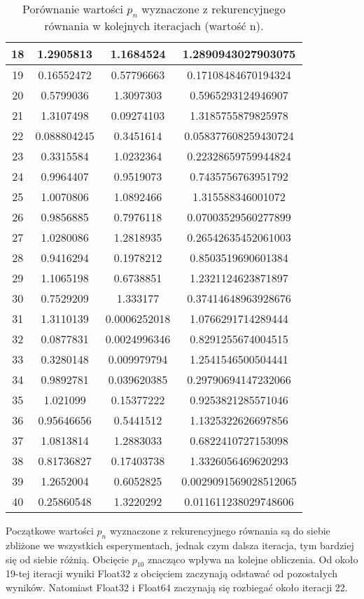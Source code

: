 \documentclass{article}
\begin{document}
\begin{table}[H]
\begin{tabular}{|c|c|c|c|}
18 & 1.2905813 & 1.1684524 & 1.2890943027903075\\ \hline
19 & 0.16552472 & 0.57796663 & 0.17108484670194324\\ \hline
20 & 0.5799036 & 1.3097303 & 0.5965293124946907\\ \hline
21 & 1.3107498 & 0.09274103 & 1.3185755879825978\\ \hline
22 & 0.088804245 & 0.3451614 & 0.058377608259430724\\ \hline
23 & 0.3315584 & 1.0232364 & 0.22328659759944824\\ \hline
24 & 0.9964407 & 0.9519073 & 0.7435756763951792\\ \hline
25 & 1.0070806 & 1.0892466 & 1.315588346001072\\ \hline
26 & 0.9856885 & 0.7976118 & 0.07003529560277899\\ \hline
27 & 1.0280086 & 1.2818935 & 0.26542635452061003\\ \hline
28 & 0.9416294 & 0.1978212 & 0.8503519690601384\\ \hline
29 & 1.1065198 & 0.6738851 & 1.2321124623871897\\ \hline
30 & 0.7529209 & 1.333177 & 0.37414648963928676\\ \hline
31 & 1.3110139 & 0.0006252018 & 1.0766291714289444\\ \hline
32 & 0.0877831 & 0.0024996346 & 0.8291255674004515\\ \hline
33 & 0.3280148 & 0.009979794 & 1.2541546500504441\\ \hline
34 & 0.9892781 & 0.039620385 & 0.29790694147232066\\ \hline
35 & 1.021099 & 0.15377222 & 0.9253821285571046\\ \hline
36 & 0.95646656 & 0.5441512 & 1.1325322626697856\\ \hline
37 & 1.0813814 & 1.2883033 & 0.6822410727153098\\ \hline
38 & 0.81736827 & 0.17403738 & 1.3326056469620293\\ \hline
39 & 1.2652004 & 0.6052825 & 0.0029091569028512065\\ \hline
40 & 0.25860548 & 1.3220292 & 0.011611238029748606\\ \hline
\end{tabular}
\caption{Porównanie wartości $p_n$ wyznaczone z rekurencyjnego równania w kolejnych iteracjach (wartość n).}
\end{table}

Początkowe wartości $p_n$ wyznaczone z rekurencyjnego równania są do siebie zbliżone we wszystkich esperymentach, jednak czym dalsza iteracja, tym bardziej się od siebie różnią. Obcięcie $p_{10}$ znacząco wpływa na kolejne obliczenia. Od około 19-tej iteracji wyniki Float32 z obcięciem zaczynają odstawać od pozostałych wyników. Natomiast Float32 i Float64 zaczynają się rozbiegać około iteracji 22.
\end{document}
